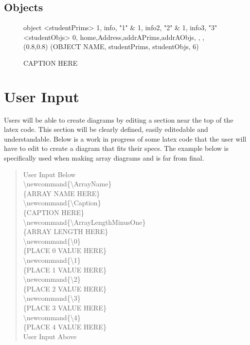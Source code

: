 \documentclass[10pt,a4paper,english]{article}
\begin{document}
\subsection*{Objects}

\begin {figure}[!htbp]
\Draw
 {object}
\Indirect \Table <studentPrims>
{  1, info, "1" 		&
   1, info2,  "2"		&
   1, info3,  "3"		
}
\Indirect \Table <studentObjs>
 {  0, home,Address,addrAPrims,addrAObjs, , , }
  \Scale (0.8,0.8)
\OD (OBJECT NAME, studentPrims, studentObjs, 6)
    \EndDraw
\caption {CAPTION HERE}
\label {fig:simpleStudent}
\end {figure}

\section{User Input}
Users will be able to create diagrams by editing a section near the top of the latex code.  This section will be clearly defined, easily editedable and understandable.  Below is a work in progress of some latex code that the user will have to edit to create a diagram that fits their specs. The example below is specifically used when making array diagrams and is far from final.

\begin{quote}{\ttfamily \raggedright \noindent
User Input Below~\\
{\textbackslash}newcommand{\{}{\textbackslash}ArrayName{\}}~\\
{\{}ARRAY NAME HERE{\}}~\\
{\textbackslash}newcommand{\{}{\textbackslash}Caption{\}}~\\
{\{}CAPTION HERE{\}}~\\
{\textbackslash}newcommand{\{}{\textbackslash}ArrayLengthMinusOne{\}}~\\
{\{}ARRAY LENGTH HERE{\}}~\\
{\textbackslash}newcommand{\{}{\textbackslash}0{\}}~\\
{\{}PLACE 0 VALUE HERE{\}}~\\
{\textbackslash}newcommand{\{}{\textbackslash}1{\}}~\\
{\{}PLACE 1 VALUE HERE{\}}~\\
{\textbackslash}newcommand{\{}{\textbackslash}2{\}}~\\
{\{}PLACE 2 VALUE HERE{\}}~\\
{\textbackslash}newcommand{\{}{\textbackslash}3{\}}~\\
{\{}PLACE 3 VALUE HERE{\}}~\\
{\textbackslash}newcommand{\{}{\textbackslash}4{\}}~\\
{\{}PLACE 4 VALUE HERE{\}}~\\
User Input Above~\\
}\end{quote}
\end{document}
